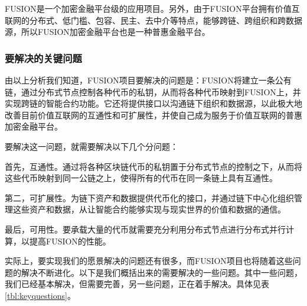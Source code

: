 \documentclass[a4paper,12pt]{article}
\begin{document}
FUSION是一个加密金融平台级的应用项目。另外，由于FUSION平台拥有价值互联网的分布式、低门槛、包容、民主、去中介等特点，能够跨链、跨组织和跨数据源，所以FUSION加密金融平台也是一种普惠金融平台。

\subsubsection{要解决的关键问题}

由以上分析我们知道，FUSION项目要解决的问题是：FUSION将建立一条公有链，通过分布式节点控制各种代币的私钥，从而将各种代币映射到FUSION上，并实现跨链的智能合约功能。它还将提供接口以沟通链下组织和数据源，以此极大地改善目前价值互联网的互通性和可扩展性，并使自己成为服务于价值互联网的普惠加密金融平台。

要解决这一问题，就需要解决以下几个分问题：

首先，互通性。通过将各种区块链代币的私钥置于分布式节点的控制之下，从而将这些代币映射到同一公链之上，使得所有的代币在同一条链上具有互通性。

第二，可扩展性。为链下资产和数据提供代币化的接口，并通过链下中心化组织管理这些资产和数据，从让智能合约能够实现与现实世界的价值和数据的通信。

最后，可用性。要承载大量的代币就需要充分利用分布式节点进行分布式并行计算，以提高FUSION的性能。

实际上，要实现我们的愿景解决的问题还有很多，而FUSION项目也将随着这些问题的解决不断进化。以下是我们概括出来的需要解决的一些问题。其中一些问题，我们已经基本解决，但需要完善，另一些问题，正在着手解决。具体见表\ref{tbl:keyquestions}。
\end{document}
